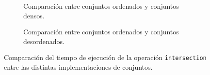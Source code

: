 \begin{itemize}
\begin{itemize}
        \begin{figure}[htbp]
          \centering
          \begin{subfigure}[b]{\linewidth}
            \centering
            \caption{Comparación entre conjuntos ordenados y conjuntos densos.}
          \end{subfigure}
          \vspace{0.8cm}
          \begin{subfigure}[b]{\linewidth}
            \centering
            \caption{Comparación entre conjuntos ordenados y conjuntos desordenados.}
          \end{subfigure}
          \caption{Comparación del tiempo de ejecución de la operación \texttt{intersection} entre las distintas implementaciones de conjuntos.}
          \label{fig:Ren-Int}
        \end{figure}


\end{itemize}
\end{itemize}
